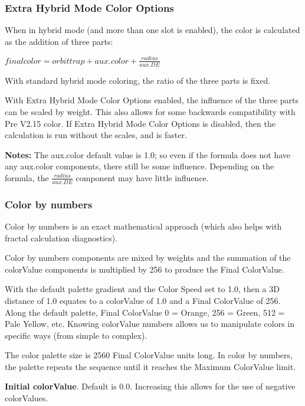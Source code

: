 \subsubsection{Extra Hybrid Mode Color Options}\label{materials-extra-hybrid-mode-color-options}

When in hybrid mode (and more than one slot is enabled), the color is calculated as the addition of three parts:

\(final color = orbit trap  +  aux.color  +  \frac{radius}{aux.DE}\)

With standard hybrid mode coloring, the ratio of the three parts is fixed.

With Extra Hybrid Mode Color Options enabled, the influence of the three parts can be scaled by weight. This also allows for some backwards compatibility with Pre V2.15 color. If Extra Hybrid Mode Color Options is disabled, then the calculation is run without the scales, and is faster.

\textbf{Notes: }The aux.color default value is 1.0; so even if the formula does not have any aux.color components, there still be some influence. Depending on the formula, the \(\frac{radius}{aux.DE}\) component may have little influence.

\subsubsection{Color by numbers}\label{materials-color-by-numbers}

Color by numbers is an exact mathematical approach (which also helps with fractal calculation diagnostics).

Color by numbers components are mixed by weights and the summation of the colorValue components is multiplied by 256 to produce the Final ColorValue.

With the default palette gradient and the Color Speed set to 1.0, then a 3D distance of 1.0 equates to a colorValue of 1.0 and a Final ColorValue of 256. Along the default palette, Final ColorValue 0 = Orange, 256 = Green, 512 = Pale Yellow, etc.
Knowing colorValue numbers allows us to manipulate colors in specific ways (from simple to complex).

The color palette size is 2560 Final ColorValue units long. In color by numbers, the palette repeats the sequence until it reaches the Maximum ColorValue limit.

\textbf{Initial colorValue}. Default is 0.0. Increasing this allows for the use of negative colorValues.

